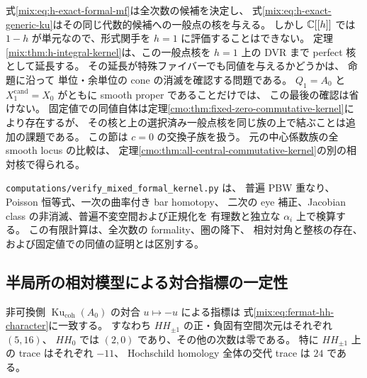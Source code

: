 \begin{remark}[形式核と固定値の核の相対整合性]
\label{mix:rem:h-special-kernel}
式\eqref{mix:eq:h-exact-formal-mf}は全次数の候補を決定し、
式\eqref{mix:eq:h-exact-generic-ku}はその同じ代数的候補への一般点の核を与える。
しかし $\mathbb C[[h]]$ では $1-h$ が単元なので、形式関手を $h=1$ に評価することはできない。
定理\ref{mix:thm:h-integral-kernel}は、この一般点核を $h=1$ 上の DVR まで
perfect 核として延長する。
その延長が特殊ファイバーでも同値を与えるかどうかは、
命題に沿って
単位・余単位の cone の消滅を確認する問題である。
$Q_1=A_0$ と $X_1^{\mathrm{cand}}=X_0$ がともに smooth proper であることだけでは、
この最後の確認は省けない。
固定値での同値自体は定理\ref{cmo:thm:fixed-zero-commutative-kernel}により存在するが、
その核と上の選択済み一般点核を同じ族の上で結ぶことは追加の課題である。
この節は $c=0$ の交換子族を扱う。
元の中心係数族の全 smooth locus の比較は、
定理\ref{cmo:thm:all-central-commutative-kernel}の別の相対核で得られる。
\end{remark}

\texttt{computations/verify\_mixed\_formal\_kernel.py} は、
普遍 PBW 重なり、Poisson 恒等式、一次の曲率付き bar homotopy、
二次の eye 補正、Jacobian class の非消滅、普遍不変空間および正規化を
有理数と独立な $\alpha_i$ 上で検算する。
この有限計算は、全次数の formality、圏の降下、
相対対角と整核の存在、および固定値での同値の証明とは区別する。

\subsection{半局所の相対模型による対合指標の一定性}

\begin{proposition}
\label{mix:prop:h-involution-character}
非可換側 $\operatorname{Ku}_{\mathrm{coh}}(A_0)$ の対合 $u\mapsto-u$ による指標は
式\eqref{mix:eq:fermat-hh-character}に一致する。
すなわち $HH_{\pm1}$ の正・負固有空間次元はそれぞれ $(5,16)$、
$HH_0$ では $(2,0)$ であり、その他の次数は零である。
特に $HH_{\pm1}$ 上の trace はそれぞれ $-11$、
Hochschild homology 全体の交代 trace は $24$ である。
\end{proposition}

